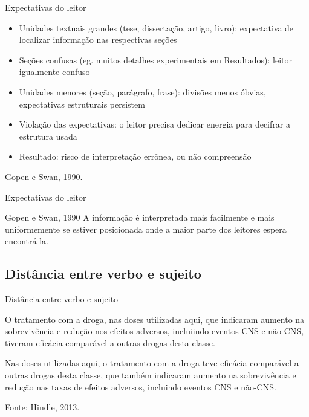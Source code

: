 \documentclass{beamer}
\begin{document}
\begin{frame}{Expectativas do leitor}
  \begin{itemize}
  \item Unidades textuais grandes (tese, dissertação, artigo, livro):
    \alert<-2>{expectativa} de localizar informação nas respectivas
    seções
  \item Seções confusas (eg. muitos detalhes experimentais em
    Resultados): leitor igualmente confuso
  \item Unidades menores (seção, parágrafo, frase): divisões menos
    óbvias, \alert<3>{expectativas estruturais persistem}
  \item Violação das expectativas: o \alert{leitor precisa dedicar
      energia} para decifrar a estrutura usada
  \item Resultado: risco de interpretação errônea, ou não compreensão
  \end{itemize}

\vfill
Gopen e Swan, 1990.
\end{frame}

\begin{frame}{Expectativas do leitor}
  \begin{block}{Gopen e Swan, 1990}
    A informação é interpretada mais facilmente e mais uniformemente
    se estiver posicionada onde a maior parte dos leitores espera
    encontrá-la.
  \end{block}
\end{frame}

\subsection{Distância entre verbo e sujeito}

\begin{frame}{Distância entre verbo e sujeito}
  \begin{example}
    O \alert{tratamento com a droga}, nas doses utilizadas aqui, que
    indicaram aumento na sobrevivência e redução nos efeitos adversos,
    incluiindo eventos CNS e não-CNS, \alert{tiveram} eficácia
    comparável a outras drogas desta classe.
  \end{example}
  \begin{example}
    Nas doses utilizadas aqui, o \alert{tratamento com a droga teve}
    eficácia comparável a outras drogas desta classe, que também
    indicaram aumento na sobrevivência e redução nas taxas de efeitos
    adversos, incluindo eventos CNS e não-CNS.
  \end{example}

  \vfill
  Fonte: Hindle, 2013.
\end{frame}
\end{document}
